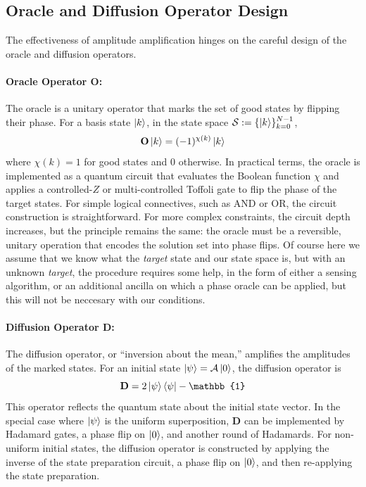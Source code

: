 \documentclass[encoding=utf8,british]{tumphthesis}
\begin{document}
        \subsection{Oracle and Diffusion Operator Design}

        The effectiveness of amplitude amplification hinges on the careful design of the oracle and diffusion operators.

        \paragraph{Oracle Operator $\mathbf{O}$:}
        The oracle is a unitary operator that marks the set of good states by flipping their phase. For a basis state $\left|k\right>$, in the state space $\mathcal{S} := \{\left|k\right>\}_{k=0}^{N-1}$,
        \begin{equation*}
        \mathbf{O} \left|k\right> = (-1)^{\chi(k)} \left|k\right>
        \end{equation*}
        where $\chi(k) = 1$ for good states and $0$ otherwise. In practical terms, the oracle is implemented as a quantum circuit that 
        evaluates the Boolean function $\chi$ and applies a controlled-$Z$ or multi-controlled Toffoli gate to flip the phase of the target states. 
        For simple logical connectives, such as AND or OR, the circuit construction is straightforward. For more complex constraints, the circuit 
        depth increases, but the principle remains the same: the oracle must be a reversible, unitary operation that encodes the solution set 
        into phase flips. Of course here we assume that we know what the \textit{target} state and our state space is, but with an unknown \textit{target},
        the procedure requires some help, in the form of either a sensing algorithm, or an additional ancilla on which a phase oracle can be applied, 
        but this will not be neccesary with our conditions.

        \paragraph{Diffusion Operator $\mathbf{D}$:}
        The diffusion operator, or “inversion about the mean,” amplifies the amplitudes of the marked states. For an initial state 
        $\left|\psi\right> = \mathcal{A}\left|0\right>$, the diffusion operator is
        \begin{equation*}
        \mathbf{D} = 2\ket{\psi}\bra{\psi} - \mathbb{1}
        \label{eq:diffusion}
        \end{equation*}
        This operator reflects the quantum state about the initial state vector. In the special case where $\left|\psi\right>$ is the uniform superposition, $\mathbf{D}$ can be 
        implemented by Hadamard gates, a phase flip on $\left|0\right>$, and another round of Hadamards. For non-uniform initial states, the diffusion operator is constructed by 
        applying the inverse of the state preparation circuit, a phase flip on $\left|0\right>$, and then re-applying the state preparation.
\end{document}
